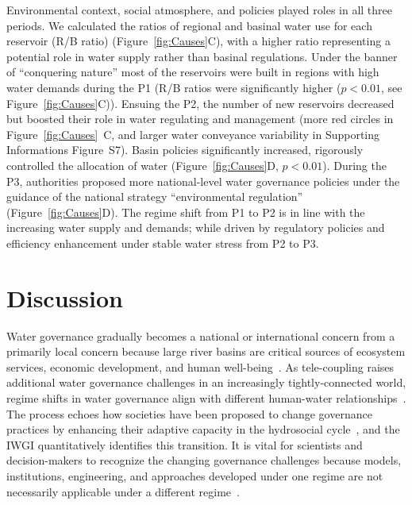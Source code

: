 \documentclass[draft]{../agujournal2019}
\begin{document}
Environmental context, social atmosphere, and policies played roles in all three periods.
We calculated the ratios of regional and basinal water use for each reservoir (R/B ratio) (Figure~\ref{fig:Causes}C), with a higher ratio representing a potential role in water supply rather than basinal regulations.
Under the banner of ``conquering nature'' most of the reservoirs were built in regions with high water demands during the P1 (R/B ratios were significantly higher ($p<0.01$, see Figure~\ref{fig:Causes}C)).
Ensuing the P2, the number of new reservoirs decreased but boosted their role in water regulating and management (more red circles in Figure~\ref{fig:Causes}~C, and larger water conveyance variability in Supporting Informations Figure~S7).  Basin policies significantly increased, rigorously controlled the allocation of water (Figure~\ref{fig:Causes}D, $p<0.01$).
During the P3, authorities proposed more national-level water governance policies under the guidance of the national strategy ``environmental regulation'' (Figure~\ref{fig:Causes}D).
The regime shift from P1 to P2 is in line with the increasing water supply and demands; while driven by regulatory policies and efficiency enhancement under stable water stress from P2 to P3.


\section{Discussion}\label{sec12}

Water governance gradually becomes a national or international concern from a primarily local concern because large river basins are critical sources of ecosystem services, economic development, and human well-being~\cite{best2019,best2020}.
As tele-coupling raises additional water governance challenges in an increasingly tightly-connected world, regime shifts in water governance align with different human-water relationships~\cite{diaz2019}.
The process echoes how societies have been proposed to change governance practices by enhancing their adaptive capacity in the hydrosocial cycle~\cite{loch2020,turton1999}, and the IWGI quantitatively identifies this transition.
It is vital for scientists and decision-makers to recognize the changing governance challenges because models, institutions, engineering, and approaches developed under one regime are not necessarily applicable under a different regime~\cite{reyers2018}.
\end{document}

